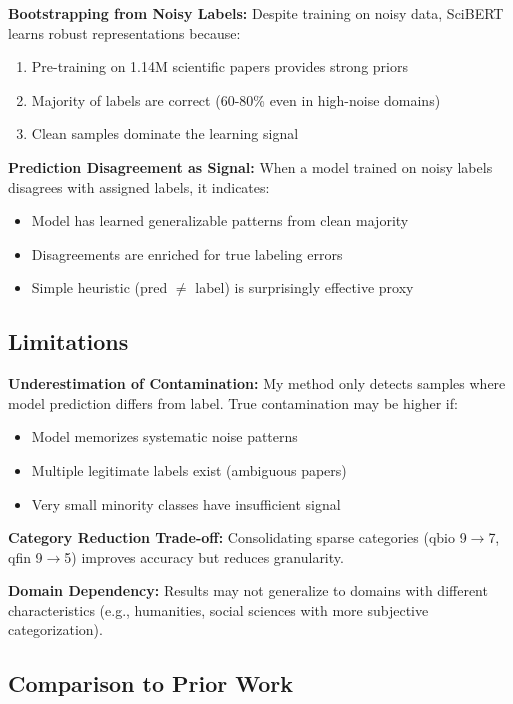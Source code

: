 \documentclass{article}
\begin{document}
\textbf{Bootstrapping from Noisy Labels:} Despite training on noisy data, SciBERT learns robust representations because:
\begin{enumerate}
    \item Pre-training on 1.14M scientific papers provides strong priors
    \item Majority of labels are correct (60-80\% even in high-noise domains)
    \item Clean samples dominate the learning signal
\end{enumerate}

\textbf{Prediction Disagreement as Signal:} When a model trained on noisy labels disagrees with assigned labels, it indicates:
\begin{itemize}
    \item Model has learned generalizable patterns from clean majority
    \item Disagreements are enriched for true labeling errors
    \item Simple heuristic (pred $\neq$ label) is surprisingly effective proxy
\end{itemize}

\subsection{Limitations}

\textbf{Underestimation of Contamination:} My method only detects samples where model prediction differs from label. True contamination may be higher if:
\begin{itemize}
    \item Model memorizes systematic noise patterns
    \item Multiple legitimate labels exist (ambiguous papers)
    \item Very small minority classes have insufficient signal
\end{itemize}

\textbf{Category Reduction Trade-off:} Consolidating sparse categories (qbio 9$\rightarrow$7, qfin 9$\rightarrow$5) improves accuracy but reduces granularity.

\textbf{Domain Dependency:} Results may not generalize to domains with different characteristics (e.g., humanities, social sciences with more subjective categorization).

\subsection{Comparison to Prior Work}
\end{document}
